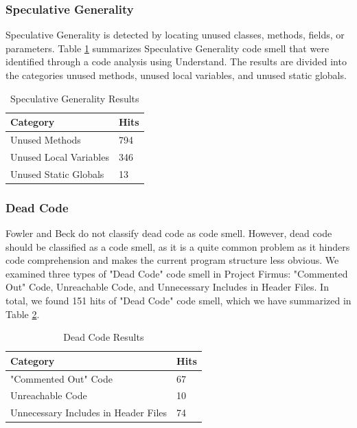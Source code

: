 \subsubsection{Speculative Generality}
Speculative Generality is detected by locating unused classes, methods, fields, or parameters. Table \ref{tab:speculativeGenerality} summarizes Speculative Generality code smell that were identified through a code analysis using Understand. The results are divided into the categories unused methods, unused local variables, and unused static globals. 

\begin{table}[]
\centering
\caption{Speculative Generality Results}
\label{tab:speculativeGenerality}
\begin{tabular}{|l|l|}
\hline
\textbf{Category}		& 	\textbf{Hits} \\ \hline
Unused Methods 			&	794  \\ \hline
Unused Local Variables 	& 	346	 \\ \hline
Unused Static Globals 	& 	13	 \\ \hline
\end{tabular}
\end{table}



\subsubsection{Dead Code}
Fowler and Beck\cite{1999:RID:311424} do not classify dead code as code smell. However, dead code should be classified as a code smell, as it is a quite common problem as it hinders code comprehension and makes the current program structure less obvious\cite{mantyla2003taxonomy}. We examined three types of "Dead Code" code smell in Project Firmus: "Commented Out" Code, Unreachable Code, and Unnecessary Includes in Header Files. In total, we found 151 hits of "Dead Code" code smell, which we have summarized in Table \ref{tab:deadCode}.

\begin{table}[]
\centering
\caption{Dead Code Results}
\label{tab:deadCode}
\begin{tabular}{|l|l|}
\hline
\textbf{Category}		& 	\textbf{Hits} \\ \hline
"Commented Out" Code 			&	67  \\ \hline
Unreachable Code 	& 	10	 \\ \hline
Unnecessary Includes in Header Files 	& 	74	 \\ \hline
\end{tabular}
\end{table}


